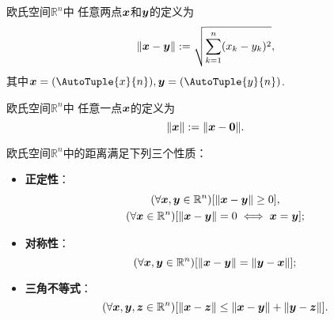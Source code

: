 \begin{definition}
欧氏空间\(\mathbb{R}^n\)中
任意两点\(\boldsymbol{x}\)和\(\boldsymbol{y}\)的定义为\begin{equation*}
	\norm{\boldsymbol{x} - \boldsymbol{y}}
	:=
	\sqrt{\sum_{k=1}^n (x_k-y_k)^2},
\end{equation*}
其中\(\vb{x}=(\AutoTuple{x}{n}),
\vb{y}=(\AutoTuple{y}{n})\).
\end{definition}
\begin{definition}
欧氏空间\(\mathbb{R}^n\)中
任意一点\(\boldsymbol{x}\)的定义为\begin{equation*}
	\norm{\boldsymbol{x}}
	:=
	\norm{\boldsymbol{x}-\boldsymbol0}.
\end{equation*}
\end{definition}
\begin{theorem}
欧氏空间\(\mathbb{R}^n\)中的距离满足下列三个性质：\begin{itemize}
	\item {\rm\bf 正定性}：\begin{gather*}
		(\forall \boldsymbol{x},\boldsymbol{y}\in\mathbb{R}^n)
		[\norm{\boldsymbol{x}-\boldsymbol{y}}\geq0], \\
		(\forall \boldsymbol{x}\in\mathbb{R}^n)
		[\norm{\boldsymbol{x}-\boldsymbol{y}}=0 \iff \boldsymbol{x}=\boldsymbol{y}];
	\end{gather*}
	\item {\rm\bf 对称性}：\begin{equation*}
		(\forall \boldsymbol{x},\boldsymbol{y}\in\mathbb{R}^n)
		[\norm{\boldsymbol{x}-\boldsymbol{y}}=\norm{\boldsymbol{y}-\boldsymbol{x}}];
	\end{equation*}
	\item {\rm\bf 三角不等式}：\begin{equation*}
		(\forall \boldsymbol{x},\boldsymbol{y},\boldsymbol{z}\in\mathbb{R}^n)
		[\norm{\boldsymbol{x}-\boldsymbol{z}}\leq\norm{\boldsymbol{x}-\boldsymbol{y}}+\norm{\boldsymbol{y}-\boldsymbol{z}}].
	\end{equation*}
\end{itemize}
\end{theorem}


